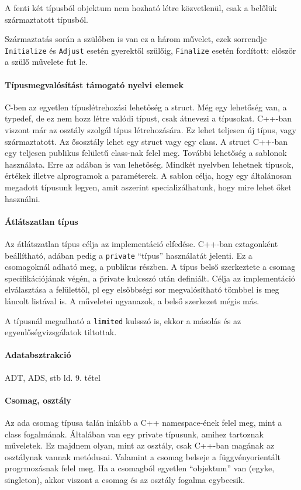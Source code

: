 \documentclass[fleqn,10pt,a4paper]{article}
\newcommand{\ut}[1]{\texttt{#1}}
\theoremstyle{magyar}
\begin{document}
  A fenti két típusból objektum nem hozható létre közvetlenül, csak a
  belőlük származtatott típusból.

  Származtatás során a szülőben is van ez a három művelet, ezek
  sorrendje \ut{Initialize} és \ut{Adjust} esetén gyerektől szülőig,
  \ut{Finalize} esetén fordított: először a szülő művelete fut le.  

  
  \paragraph{Típusmegvalósítást támogató nyelvi elemek}
  C-ben az egyetlen típuslétrehozási lehetőség a struct. Még egy
  lehetőség van, a typedef, de ez nem hozz létre valódi típust, csak
  átnevezi a típusokat. C++-ban viszont már az osztály szolgál típus
  létrehozására. Ez lehet teljesen új típus, vagy származtatott. Az
  ősosztály lehet egy struct vagy egy class. A struct C++-ban egy
  teljesen publikus felületű class-nak felel meg.
  További lehetőség a sablonok használata. Erre az adában is van
  lehetőség. Mindkét nyelvben lehetnek típusok, értékek illetve
  alprogramok a paraméterek. A sablon célja, hogy egy általánosan
  megadott típusunk legyen, amit aszerint specializálhatunk, hogy mire
  lehet őket használni.

  \paragraph{Átlátszatlan típus}
  Az átlátszatlan típus célja az implementáció elfedése. C++-ban
  eztagonként beállítható, adában pedig a \ut{private} ``típus''
  használatát jelenti. Ez a csomagoknál adható meg, a publikus
  részben. A típus belső szerkeztete a csomag specifikációjának végén,
  a \u{private} kulcsszó után definiált. Célja az implementáció
  elválasztása a felülettől, pl egy elsőbbségi sor megvalósítható
  tömbbel is meg láncolt listával is. A műveletei ugyanazok, a belső
  szerkezet mégis más.

  A típusnál megadható a \ut{limited} kulsszó is, ekkor a másolás és
  az egyenlőségvizsgálatok tiltottak.

  \paragraph{Adatabsztrakció}
  ADT, ADS, stb ld. 9. tétel

  \paragraph{Csomag, osztály}
  Az ada csomag típusa talán inkább a C++ namespace-ének felel meg, mint a
  class fogalmának. Általában van egy private típusunk, amihez
  tartoznak műveletek. Ez majdnem olyan, mint az osztály, csak C++-ban
  magának az osztálynak vannak metódusai. Valamint a csomag belseje a
  függvényorientált progrmozásnak felel meg.
  Ha a csomagból egyetlen ``objektum'' van (egyke, singleton), akkor
  viszont a csomag és az osztály fogalma egybeesik.
\end{document}

